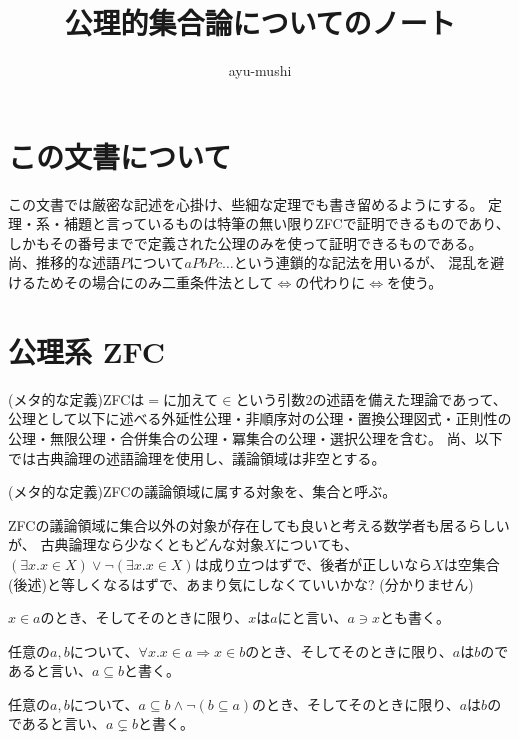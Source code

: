\documentclass[uplatex,papersize,dvipdfmx]{jsarticle}
\title{公理的集合論についてのノート}
\author{ayu-mushi}
\begin{document}
  \maketitle
  \section{この文書について}
    この文書では厳密な記述を心掛け、些細な定理でも書き留めるようにする。
    定理・系・補題と言っているものは特筆の無い限りZFCで証明できるものであり、しかもその番号までで定義された公理のみを使って証明できるものである。
    尚、推移的な述語$P$について$a P b P c \dots$という連鎖的な記法を用いるが、
    混乱を避けるためその場合にのみ二重条件法として$\Leftrightarrow$の代わりに$\iff$を使う。
  \section{公理系 ZFC}
    \begin{definition}[ZFC]
      (メタ的な定義)ZFCは$=$に加えて$\in$という引数$2$の述語を備えた理論であって、
      公理として以下に述べる外延性公理・非順序対の公理・置換公理図式・正則性の公理・無限公理・合併集合の公理・冪集合の公理・選択公理を含む。
      尚、以下では古典論理の述語論理を使用し、議論領域は非空とする。
    \end{definition}
    \begin{definition}[集合]
      (メタ的な定義)ZFCの議論領域に属する対象を、集合と呼ぶ。
      \begin{note}
        ZFCの議論領域に集合以外の対象が存在しても良いと考える数学者も居るらしいが、
        古典論理なら少なくともどんな対象$X$についても、$(\exists x. x \in X) \lor \lnot (\exists x. x \in X)$は成り立つはずで、後者が正しいなら$X$は空集合(後述)と等しくなるはずで、あまり気にしなくていいかな? (分かりません)
      \end{note}
    \end{definition}
    \begin{definition}[属する]
      $x \in a$のとき、そしてそのときに限り、$x$は$a$にと言い、$a \ni x$とも書く。
    \end{definition}
    \begin{definition}[部分集合]
      任意の$a, b$について、$\forall x. x \in a \Rightarrow x \in b$のとき、そしてそのときに限り、$a$は$b$のであると言い、$a \subseteq b$と書く。
    \end{definition}
    \begin{definition}[真部分集合]
      任意の$a, b$について、$a \subseteq b \land \lnot (b \subseteq a)$のとき、そしてそのときに限り、$a$は$b$のであると言い、$a \subsetneq b$と書く。
    \end{definition}
\end{document}
